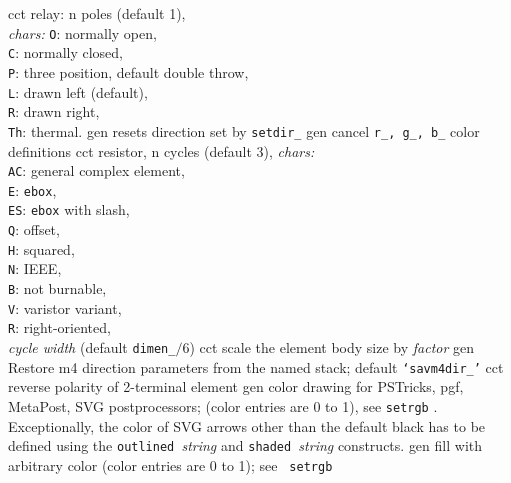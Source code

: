 %
  {cct}%
  {relay: n poles (default 1),\\
    {\sl chars:} {\tt O}: normally open,\\
    {\tt C}: normally closed,\\
    {\tt P}: three position, default double throw,\\
    {\tt L}: drawn left (default),\\
    {\tt R}: drawn right,\\
    {\tt Th}: thermal.}%
%
  {gen}%
  {resets direction set by {\tt setdir\_}}%
%
  {gen}%
  {cancel {\tt r\_, g\_, b\_} color definitions}%
%
  {cct}%
  {resistor, n cycles (default 3), {\sl chars:}\\
    {\tt AC}: general complex element,\\
    {\tt E}: {\tt ebox},\\
    {\tt ES}: {\tt ebox} with slash,\\
    {\tt Q}: offset,\\
    {\tt H}: squared,\\
    {\tt N}: IEEE,\\
    {\tt B}: not burnable,\\
    {\tt V}: varistor variant,\\
    {\tt R}: right-oriented,\\
    {\sl cycle width} (default {\tt dimen\_}$/6$)
   }%
%
  {cct}%
  {scale the element body size by {\sl factor}}%
%
  {gen}%
  {Restore m4 direction parameters from the named stack;
    default {\tt `savm4dir\_'}}%
%
  {cct}%
  {reverse polarity of 2-terminal element}%
%
  {gen}%
  {color drawing for PSTricks, pgf, MetaPost, SVG postprocessors;
   (color entries are 0 to 1),
   see {\tt setrgb} .  Exceptionally, the color
   of SVG arrows other than the default black has to be defined using the
   {\tt outlined }{\sl string} and {\tt shaded }{\sl string} constructs.}%
%
  {gen}%
  {fill with arbitrary color (color entries are 0 to 1); see {\tt
   setrgb}}%
